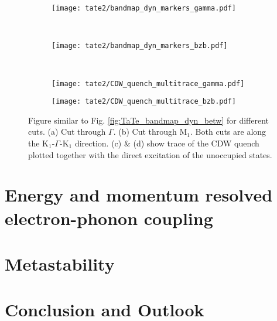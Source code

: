 \begin{figure}[h!]
	\centering
	\begin{subfigure}[b]{\textwidth}
		\texttt{[image: tate2/bandmap\_dyn\_markers\_gamma.pdf]}
		\caption{}
	\end{subfigure}
	\\
	\centering
	\begin{subfigure}[b]{\textwidth}
		\texttt{[image: tate2/bandmap\_dyn\_markers\_bzb.pdf]}
		\caption{}
	\end{subfigure}
	\\
	\begin{subfigure}[b]{0.33\textwidth}
		\texttt{[image: tate2/CDW\_quench\_multitrace\_gamma.pdf]}
		\caption{}
	\end{subfigure}
	\begin{subfigure}[b]{0.33\textwidth}
		\texttt{[image: tate2/CDW\_quench\_multitrace\_bzb.pdf]}
		\caption{}
	\end{subfigure}
	\caption{Figure similar to Fig. \ref{fig:TaTe_bandmap_dyn_betw} for different cuts. (a) Cut through $\Gamma$. (b) Cut through M$_1$. Both cuts are along the K$_1$-$\Gamma$-K$_1$ direction. (c) \& (d) show trace of the CDW quench plotted together with the direct excitation of the unoccupied states.}
	\label{fig:TaTe_bandmap_dyn_bzb}
\end{figure}


\section{Energy and momentum resolved electron-phonon coupling}


\section{Metastability}


\section{Conclusion and Outlook}
